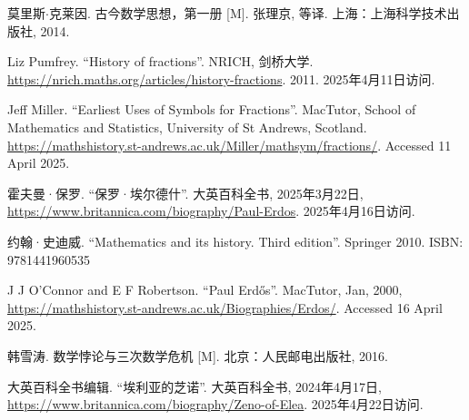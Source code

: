 莫里斯$\cdot$克莱因. 古今数学思想，第一册 [M]. 张理京, 等译. 上海：上海科学技术出版社, 2014. %

Liz Pumfrey. ``History of fractions''. NRICH, 剑桥大学. \url{https://nrich.maths.org/articles/history-fractions}. 2011. 2025年4月11日访问.


Jeff Miller. ``Earliest Uses of Symbols for Fractions''. MacTutor, School of Mathematics and Statistics, University of St Andrews, Scotland. \url{https://mathshistory.st-andrews.ac.uk/Miller/mathsym/fractions/}. Accessed 11 April 2025.

霍夫曼·保罗. ``保罗·埃尔德什''. 大英百科全书, 2025年3月22日, \url{https://www.britannica.com/biography/Paul-Erdos}. 2025年4月16日访问.

约翰·史迪威. ``Mathematics and its history. Third edition''. Springer 2010. ISBN: 9781441960535


J J O'Connor and E F Robertson. ``Paul Erdős''. MacTutor, Jan, 2000, \url{https://mathshistory.st-andrews.ac.uk/Biographies/Erdos/}. Accessed 16 April 2025.

韩雪涛. 数学悖论与三次数学危机 [M]. 北京：人民邮电出版社, 2016. %

大英百科全书编辑. ``埃利亚的芝诺''. 大英百科全书, 2024年4月17日, \url{https://www.britannica.com/biography/Zeno-of-Elea}. 2025年4月22日访问.


